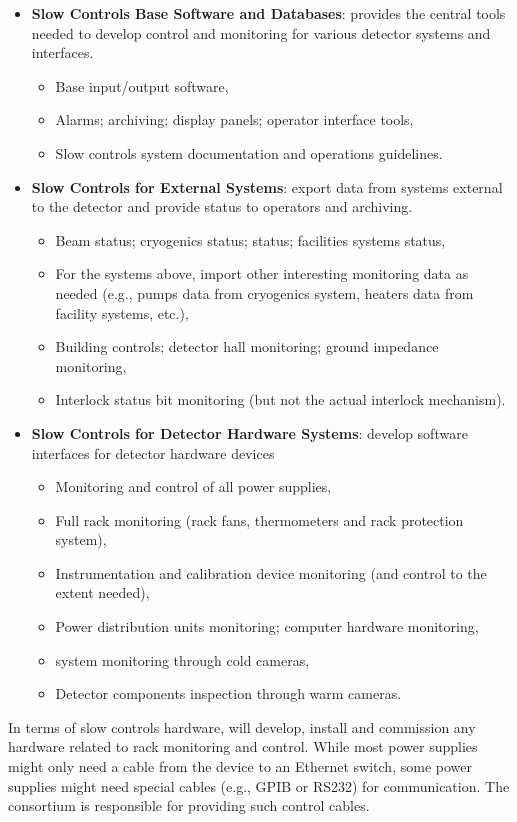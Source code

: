 \begin{itemize}
\item {\bf Slow Controls Base Software and Databases}: provides the central tools needed to develop control and monitoring for various detector systems and interfaces.
  \begin{itemize}
  \item Base input/output software,
  \item Alarms; archiving; display panels; operator interface tools,
  \item Slow controls system documentation and operations guidelines.
  \end{itemize}
\item {\bf Slow Controls for External Systems}: export data from systems external to the detector and provide status to operators and archiving.
  \begin{itemize}
  \item Beam status; cryogenics status;  status; facilities systems status,
  \item For the systems above, import other interesting monitoring data as needed (e.g., pumps data from cryogenics system, heaters data from facility systems, etc.),
  \item Building controls; detector hall monitoring; ground impedance monitoring,
  \item Interlock status bit monitoring (but not the actual interlock mechanism).
  \end{itemize}
\item {\bf Slow Controls for Detector Hardware Systems}: develop software interfaces for detector hardware devices
  \begin{itemize}
  \item Monitoring and control of all power supplies,
  \item Full rack monitoring (rack fans, thermometers and rack protection system),
  \item Instrumentation and calibration device monitoring (and control to the extent needed),
  \item Power distribution units monitoring; computer hardware monitoring,
  \item {} system monitoring through cold cameras,
  \item Detector components inspection through warm cameras.
  \end{itemize}
\end{itemize}

In terms of slow controls hardware,  will develop, install and
commission any hardware related to rack monitoring and control. While
most power supplies might only need a cable from the device to an
Ethernet switch, some power supplies might need special cables (e.g., 
GPIB or RS232) for communication. The  consortium is responsible for
providing such control cables.

